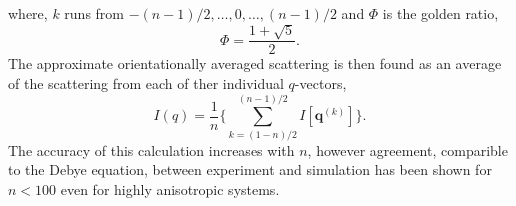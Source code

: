 %
where, $k$ runs from $-(n-1)/2,\ldots,0,\ldots,(n-1)/2$ and $\Phi$ is the golden ratio,
%
\begin{equation}
    \Phi = \frac{1+\sqrt{5}}{2}.
\end{equation}
%
The approximate orientationally averaged scattering is then found as an average of the scattering from each of ther individual $q$-vectors,
%
\begin{equation}
    I(q) = \frac{1}{n}\Bigg\{\sum_{k=(1-n)/2}^{(n-1)/2} I[\mathbf{q}^{(k)}]\Bigg\}.
\end{equation}
%
The accuracy of this calculation increases with $n$, however agreement, comparible to the Debye equation, between experiment and simulation has been shown for $n < 100$ even for highly anisotropic systems.
